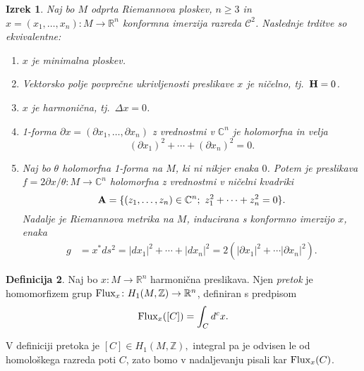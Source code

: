 \documentclass[12pt,a4paper,twoside]{article}
\theoremstyle{definition} %
\newtheorem{definicija}{Definicija}[section]
\theoremstyle{plain} %
\newtheorem{izrek}[definicija]{Izrek}
\numberwithin{equation}{section}  %
\newcommand{\R}{\mathbb R}
\newcommand{\Z}{\mathbb Z}
\newcommand{\C}{\mathbb C}
\begin{document}
\begin{izrek}
Naj bo $M$ odprta Riemannova ploskev, $n \geq 3$ in $x = (x_1, \dots , x_n) \colon M \to \R^{n}$ konformna imerzija razreda $\mathcal{C}^2$. Naslednje trditve so ekvivalentne:
\begin{enumerate}
	\item $x$ je minimalna ploskev.
	\item Vektorsko polje povprečne ukrivljenosti preslikave $x$ je ničelno, tj.~$\textbf{\textup{H}} = 0$.
	\item $x$ je harmonična, tj.~$\Delta{x} = 0$.
	\item 1-forma $ \partial{x} = (\partial{x_1}, \dots , \partial{x_n})$ z vrednostmi v $\C^{n}$ je holomorfna in velja
			\begin{equation}
			(\partial{x_1})^2 + \cdots + (\partial{x_n})^2 = 0.
			\end{equation}
	\item Naj bo $\theta$ holomorfna 1-forma na $M$, ki ni nikjer enaka $0$. Potem je preslikava $f = 2\partial{x} / \theta \colon M \to \C^{n}$ holomorfna z 				vrednostmi v \emph{ničelni kvadriki}
			\begin{equation} \label{ničelna-kvadrika}		
			\textbf{\textup{A}} = \{ (z_1, \dots , z_n) \in \C^{n} ; \ z_{1}^{2} + \cdots + z_{n}^{2} = 0 \}.
			\end{equation}	
		Nadalje je Riemannova metrika na $M$, inducirana s konformno imerzijo $x$, enaka
			\begin{align}
			g &= x^{*} ds^2 = |dx_1|^2 + \cdots + |dx_n|^2 = 2 (|\partial{x_1}|^2 + \cdots |\partial{x_n}|^2).
			\end{align}			
\end{enumerate}
\end{izrek}

\begin{definicija}
Naj bo $x \colon M \to \R^{n}$ harmonična preslikava. Njen \emph{pretok} je homomorfizem grup $\textup{Flux}_{x} \colon H_{1} (M, \Z) \to \R^{n}$, definiran s predpisom 
\begin{equation}
\textup{Flux}_{x} ([C]) = \int_{C} {d^{c} x}.
\end{equation}
\end{definicija}

V definiciji pretoka je $[C] \in H_{1} (M, \Z),$ integral pa je odvisen le od homološkega razreda poti $C$, zato bomo v nadaljevanju pisali kar $\textup{Flux}_{x} (C)$.
\end{document}
